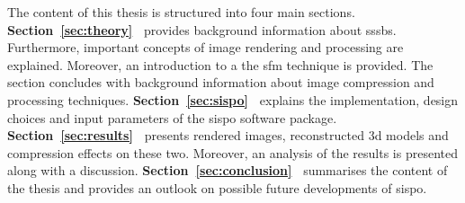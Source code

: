 The content of this thesis is structured into four main sections. \newline
\textbf{Section~\ref{sec:theory}~} provides background information about \glspl{sssb}. Furthermore, important concepts of image rendering and processing are explained. Moreover, an introduction to a the \gls{sfm} technique is provided. The section concludes with background information about image compression and processing techniques. \newline
\textbf{Section~\ref{sec:sispo}~} explains the implementation, design choices and input parameters of the \gls{sispo} software package. \newline
\textbf{Section~\ref{sec:results}~} presents rendered images, reconstructed \gls{3d} models and compression effects on these two. Moreover, an analysis of the results is presented along with a discussion. \newline
\textbf{Section~\ref{sec:conclusion}~} summarises the content of the thesis and provides an outlook on possible future developments of \gls{sispo}.


